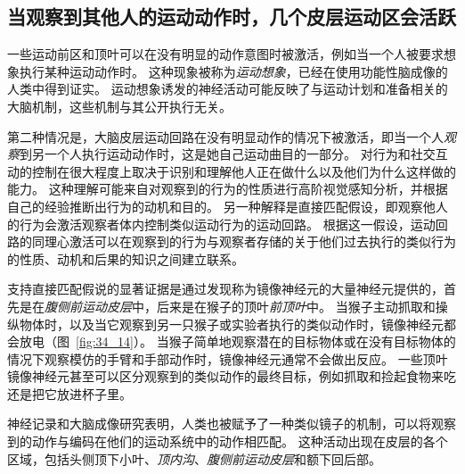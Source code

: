 \subsection{当观察到其他人的运动动作时，几个皮层运动区会活跃}

一些运动前区和顶叶可以在没有明显的动作意图时被激活，例如当一个人被要求想象执行某种运动动作时。
这种现象被称为\textit{运动想象}，已经在使用功能性脑成像的人类中得到证实。
运动想象诱发的神经活动可能反映了与运动计划和准备相关的大脑机制，这些机制与其公开执行无关。


第二种情况是，大脑皮层运动回路在没有明显动作的情况下被激活，即当一个人\textit{观察}到另一个人执行运动动作时，这是她自己运动曲目的一部分。
对行为和社交互动的控制在很大程度上取决于识别和理解他人正在做什么以及他们为什么这样做的能力。
这种理解可能来自对观察到的行为的性质进行高阶视觉感知分析，并根据自己的经验推断出行为的动机和目的。
另一种解释是直接匹配假设，即观察他人的行为会激活观察者体内控制类似运动行为的运动回路。
根据这一假设，运动回路的同理心激活可以在观察到的行为与观察者存储的关于他们过去执行的类似行为的性质、动机和后果的知识之间建立联系。


支持直接匹配假说的显著证据是通过发现称为镜像神经元的大量神经元提供的，首先是在\textit{腹侧前运动皮层}中，后来是在猴子的顶叶\textit{前顶叶}中。
当猴子主动抓取和操纵物体时，以及当它观察到另一只猴子或实验者执行的类似动作时，镜像神经元都会放电（图~\ref{fig:34_14}）。
当猴子简单地观察潜在的目标物体或在没有目标物体的情况下观察模仿的手臂和手部动作时，镜像神经元通常不会做出反应。
一些顶叶镜像神经元甚至可以区分观察到的类似动作的最终目标，例如抓取和捡起食物来吃还是把它放进杯子里。


神经记录和大脑成像研究表明，人类也被赋予了一种类似镜子的机制，可以将观察到的动作与编码在他们的运动系统中的动作相匹配。
这种活动出现在皮层的各个区域，包括头侧顶下小叶、\textit{顶内沟}、\textit{腹侧前运动皮层}和额下回后部。


